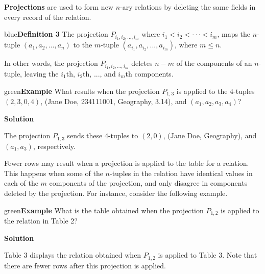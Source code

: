 \documentclass[11pt]{article}
\newenvironment{example}[1][\unskip]{\begin{mybox}{green}{\textbf{Example} {#1}}}{\end{mybox}}
\newenvironment{definition}[1]{\begin{mybox}{blue}{\textbf{Definition #1}}}{\end{mybox}}
\begin{document}
\textbf{Projections} are used to form new $n$-ary relations by deleting the same fields in every record of the relation.

\begin{definition}{3}
The projection $P_{i_1,i_2, ...,i_m}$ where $i_1 < i_2 < \cdot \cdot \cdot < i_m$, maps the $n$-tuple $(a_1, a_2, ..., a_n)$ to the $m$-tuple $(a_{i_1}, a_{i_2}, ..., a_{i_m})$, where $m \leq n$.
\end{definition}

In other words, the projection $P_{i_1,i_2, ...,i_m}$ deletes $n - m$ of the components of an $n$-tuple, leaving the $i_{1}$th, $i_2$th, ..., and $i_m$th components.

\begin{example}
What results when the projection $P_{1,3}$ is applied to the $4$-tuples $(2, 3, 0, 4)$, (Jane Doe, 234111001, Geography, 3.14), and $(a_1, a_2, a_3, a_4)$?

\textbf{Solution}

The projection $P_{1, 3}$ sends these $4$-tuples to $(2, 0)$, (Jane Doe, Geography), and $(a_1, a_3)$, respectively.
\end{example}

Fewer rows may result when a projection is applied to the table for a relation. This happens when some of the $n$-tuples in the relation have identical values in each of the $m$ components of the projection, and only disagree in components deleted by the projection. For instance, consider the following example.

\begin{example}
What is the table obtained when the projection $P_{1, 2}$ is applied to the relation in Table 2?

\textbf{Solution}

Table 3 displays the relation obtained when $P_{1, 2}$ is applied to Table 3. Note that there are fewer rows after this projection is applied.
\end{example}
\end{document}
